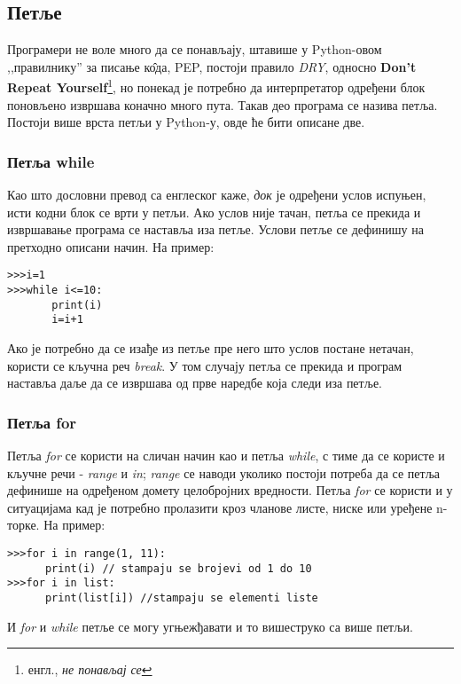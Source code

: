 \subsection{Петље}

Програмери не воле много да се понављају, штавише у Python-овом ,,правилнику'' за писање к\^{о}да, PEP\cite{PEP}, постоји правило \emph{DRY}, односно \textbf{Don't Repeat Yourself}\footnote{енгл., \emph{не понављај се}}, но понекад је потребно да интерпретатор одређени блок поновљено извршава коначно много пута. Такав део програма се назива петља. Постоји више врста петљи у Python-у, овде ће бити описане две.

\subsubsection{Петља while}

Као што дословни превод са енглеског каже, \emph{док} је одређени услов испуњен, исти кодни блок се врти у петљи. Ако услов није тачан, петља се прекида и извршавање програма се наставља иза петље. Услови петље се дефинишу на претходно описани начин. На пример:

\begin{lstlisting}[caption = Пример while петље, label = while]
>>>i=1
>>>while i<=10:
       print(i)
       i=i+1
\end{lstlisting}

Ако је потребно да се изађе из петље пре него што услов постане нетачан, користи се кључна реч \emph{break}. У том случају петља се прекида и програм наставља даље да се извршава од прве наредбе која следи иза петље.

\subsubsection{Петља for}

Петља \emph{for} се користи на сличан начин као и петља \emph{while}, с тиме да се користе и кључне речи - \emph{range} и \emph{in}; \emph{range} се наводи уколико постоји потреба да се петља дефинише на одређеном домету целобројних вредности. Петља \emph{for} се користи и у ситуацијама кад је потребно пролазити кроз чланове листе, ниске или уређене n-торке. На пример:

\begin{lstlisting}[caption = Примери \emph{for} петље, label = for]
>>>for i in range(1, 11):
      print(i) // stampaju se brojevi od 1 do 10
>>>for i in list:
      print(list[i]) //stampaju se elementi liste
\end{lstlisting}

И \emph{for} и \emph{while} петље се могу угњежђавати и то вишеструко са више петљи.
